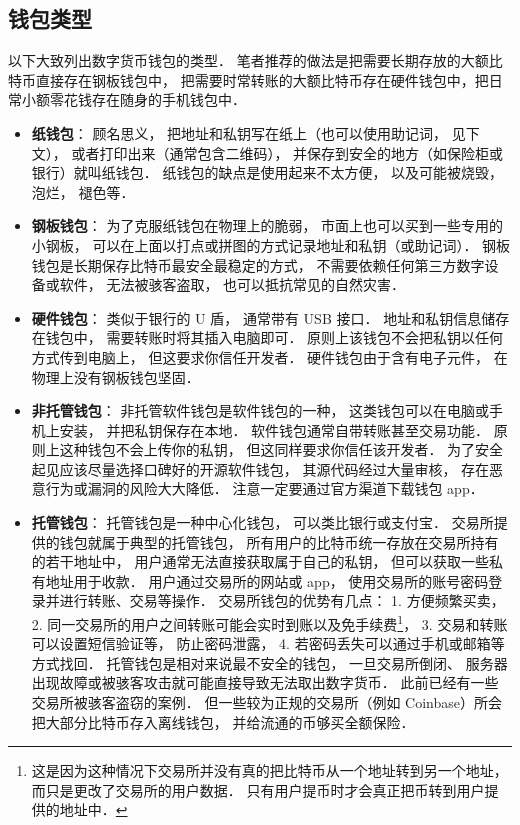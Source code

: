 \subsection{钱包类型}
以下大致列出数字货币钱包的类型． 笔者推荐的做法是把需要长期存放的大额比特币直接存在钢板钱包中， 把需要时常转账的大额比特币存在硬件钱包中，把日常小额零花钱存在随身的手机钱包中．
\begin{itemize}
\item \textbf{纸钱包}： 顾名思义， 把地址和私钥写在纸上（也可以使用助记词， 见下文）， 或者打印出来（通常包含二维码）， 并保存到安全的地方（如保险柜或银行）就叫纸钱包． 纸钱包的缺点是使用起来不太方便， 以及可能被烧毁， 泡烂， 褪色等．
\item \textbf{钢板钱包}： 为了克服纸钱包在物理上的脆弱， 市面上也可以买到一些专用的小钢板， 可以在上面以打点或拼图的方式记录地址和私钥（或助记词）． 钢板钱包是长期保存比特币最安全最稳定的方式， 不需要依赖任何第三方数字设备或软件， 无法被骇客盗取， 也可以抵抗常见的自然灾害．
\item \textbf{硬件钱包}： 类似于银行的 U 盾， 通常带有 USB 接口． 地址和私钥信息储存在钱包中， 需要转账时将其插入电脑即可． 原则上该钱包不会把私钥以任何方式传到电脑上， 但这要求你信任开发者． 硬件钱包由于含有电子元件， 在物理上没有钢板钱包坚固．
\item \textbf{非托管钱包}： 非托管软件钱包是软件钱包的一种， 这类钱包可以在电脑或手机上安装， 并把私钥保存在本地． 软件钱包通常自带转账甚至交易功能． 原则上这种钱包不会上传你的私钥， 但这同样要求你信任该开发者． 为了安全起见应该尽量选择口碑好的开源软件钱包， 其源代码经过大量审核， 存在恶意行为或漏洞的风险大大降低． 注意一定要通过官方渠道下载钱包 app．
\item \textbf{托管钱包}： 托管钱包是一种中心化钱包， 可以类比银行或支付宝． 交易所提供的钱包就属于典型的托管钱包， 所有用户的比特币统一存放在交易所持有的若干地址中， 用户通常无法直接获取属于自己的私钥， 但可以获取一些私有地址用于收款． 用户通过交易所的网站或 app， 使用交易所的账号密码登录并进行转账、交易等操作． 交易所钱包的优势有几点： 1. 方便频繁买卖， 2. 同一交易所的用户之间转账可能会实时到账以及免手续费\footnote{这是因为这种情况下交易所并没有真的把比特币从一个地址转到另一个地址， 而只是更改了交易所的用户数据． 只有用户提币时才会真正把币转到用户提供的地址中．}， 3. 交易和转账可以设置短信验证等， 防止密码泄露， 4. 若密码丢失可以通过手机或邮箱等方式找回． 托管钱包是相对来说最不安全的钱包， 一旦交易所倒闭、 服务器出现故障或被骇客攻击就可能直接导致无法取出数字货币． 此前已经有一些交易所被骇客盗窃的案例． 但一些较为正规的交易所（例如 Coinbase）所会把大部分比特币存入离线钱包， 并给流通的币够买全额保险．
\end{itemize}

